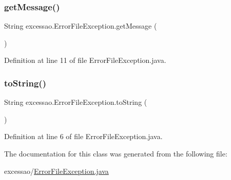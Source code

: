 \subsubsection{\texorpdfstring{get\+Message()}{getMessage()}}
{\footnotesize\ttfamily String excessao.\+Error\+File\+Exception.\+get\+Message (\begin{DoxyParamCaption}{ }\end{DoxyParamCaption})}



Definition at line 11 of file Error\+File\+Exception.\+java.

\hypertarget{classexcessao_1_1ErrorFileException_af764a39592ff12424d4dd76ef9c1fc30}{}\label{classexcessao_1_1ErrorFileException_af764a39592ff12424d4dd76ef9c1fc30} 
\subsubsection{\texorpdfstring{to\+String()}{toString()}}
{\footnotesize\ttfamily String excessao.\+Error\+File\+Exception.\+to\+String (\begin{DoxyParamCaption}{ }\end{DoxyParamCaption})}



Definition at line 6 of file Error\+File\+Exception.\+java.



The documentation for this class was generated from the following file\+:\begin{DoxyCompactItemize}
\item 
excessao/\hyperlink{ErrorFileException_8java}{Error\+File\+Exception.\+java}\end{DoxyCompactItemize}
